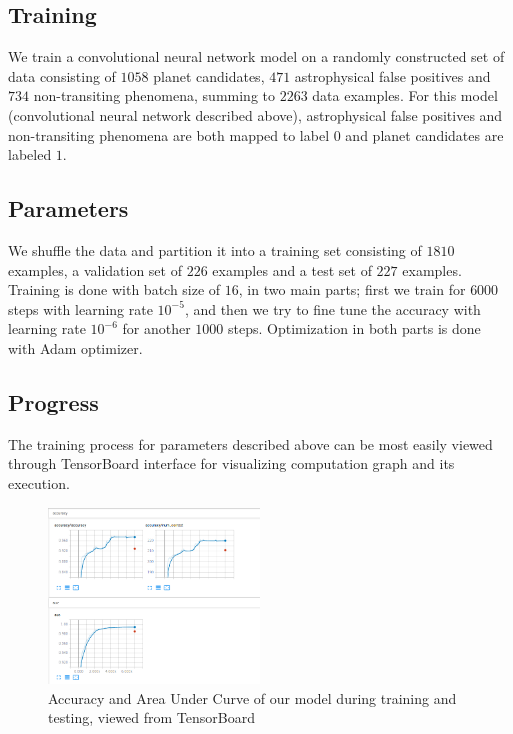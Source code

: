 \documentclass[twoside]{article}
\begin{document}
\begin{multicols}{2}
\section{Training}
We train a convolutional neural network model on a randomly constructed set of data consisting of $1058$ planet candidates, $471$ astrophysical false positives and $734$ non-transiting phenomena, summing to $2263$ data examples. For this model (convolutional neural network described above), astrophysical false positives and non-transiting phenomena are both mapped to label $0$ and planet candidates are labeled $1$. 

\subsection{Parameters}
We shuffle the data and partition it into a training set consisting of $1810$ examples, a validation set of $226$ examples and a test set of $227$ examples. Training is done with batch size of $16$, in two main parts; first we train for $6000$ steps with learning rate $10^{-5}$, and then we try to fine tune the accuracy with learning rate $10^{-6}$ for another $1000$ steps. Optimization in both parts is done with Adam optimizer.

\subsection{Progress}
The training process for parameters described above can be most easily viewed through TensorBoard interface for visualizing computation graph and its execution. 
\begin{figure}[H]
\includegraphics[width=0.5\textwidth]{train-test_acc}
\caption{Accuracy and Area Under Curve of our model during training and testing, viewed from TensorBoard}
\label{fig:accuracy}
\end{figure}


\end{multicols}
\end{document}
